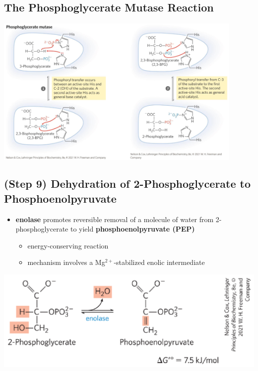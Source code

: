 \documentclass[10pt]{article}
\begin{document}
\subsection*{The Phosphoglycerate Mutase Reaction}
\begin{center} 
	\includegraphics*[width=0.9\textwidth]{L1_18.png}
\end{center}

\subsection*{(Step 9) Dehydration of 2-Phosphoglycerate to Phosphoenolpyruvate}
\begin{itemize}
	\item \textbf{enolase} promotes reversible removal of a molecule of water from 2-phosphoglycerate to yield \textbf{phosphoenolpyruvate (PEP)}
	\begin{itemize}
        \item energy-conserving reaction
        \item mechanism involves a Mg$^{2+}$-stabilized enolic intermediate
    \end{itemize}
\end{itemize}
\begin{center} 
    \includegraphics*[width=\textwidth]{L1_19.png}
\end{center}
\end{document}

